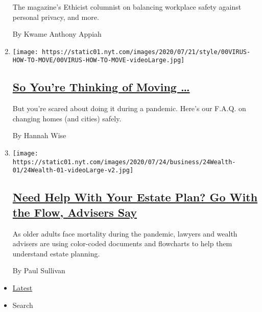 \begin{enumerate}
  The magazine's Ethicist columnist on balancing workplace safety
  against personal privacy, and more.

  By Kwame Anthony Appiah
\item
  \texttt{[image: https://static01.nyt.com/images/2020/07/21/style/00VIRUS-HOW-TO-MOVE/00VIRUS-HOW-TO-MOVE-videoLarge.jpg]}

  \hypertarget{so-youre-thinking-of-moving-}{%
  \subsection{\texorpdfstring{\href{/2020/07/24/style/moving-during-covid-coronavirus.html}{So
  You're Thinking of Moving
  \ldots{}}}{So You're Thinking of Moving \ldots{}}}\label{so-youre-thinking-of-moving-}}

  But you're scared about doing it during a pandemic. Here's our F.A.Q.
  on changing homes (and cities) safely.

  By Hannah Wise
\item
  \texttt{[image: https://static01.nyt.com/images/2020/07/24/business/24Wealth-01/24Wealth-01-videoLarge-v2.jpg]}

  \hypertarget{need-help-with-your-estate-plan-go-with-the-flow-advisers-say}{%
  \subsection{\texorpdfstring{\href{/2020/07/24/your-money/need-help-with-your-estate-plan-go-with-the-flow-advisers-say.html}{Need
  Help With Your Estate Plan? Go With the Flow, Advisers
  Say}}{Need Help With Your Estate Plan? Go With the Flow, Advisers Say}}\label{need-help-with-your-estate-plan-go-with-the-flow-advisers-say}}

  As older adults face mortality during the pandemic, lawyers and wealth
  advisers are using color-coded documents and flowcharts to help them
  understand estate planning.

  By Paul Sullivan
\end{enumerate}

\begin{itemize}
\tightlist
\item
  \protect\hyperlink{stream-panel}{Latest}
\item
  Search
\end{itemize}

